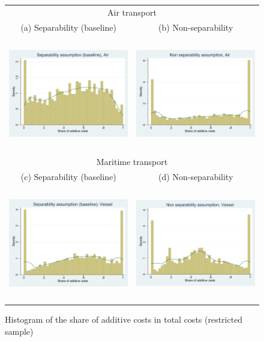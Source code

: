 \documentclass[a4paper,11pt]{article}
\begin{document}
\begin{figure}[htbp]
\caption{Histogram of the share of additive costs in total costs (restricted sample)}
\label{fig:histogram_beta_robustness}
\begin{center}
\begin{tabular}{cc}
\multicolumn{2}{c}{Air transport} \\
{\small (a) Separability (baseline)} & {\small (b) Non-separability}\\
\includegraphics[width=7cm, height=5cm]{Etude_beta_pond_sitc2separe_air.pdf}
& \includegraphics[width=7cm, height=5cm]{Etude_beta_pond_sitc2ns_air.pdf} \\
\multicolumn{2}{c}{Maritime transport} \\
{\small (c) Separability (baseline)} & {\small (d) Non-separability}\\
\includegraphics[width=7cm, height=5cm]{Etude_beta_pond_sitc2separe_ves.pdf}
& \includegraphics[width=7cm, height=5cm]{Etude_beta_pond_sitc2ns_ves.pdf} \\

\end{tabular}
\end{center}
\end{figure}
\end{document}

